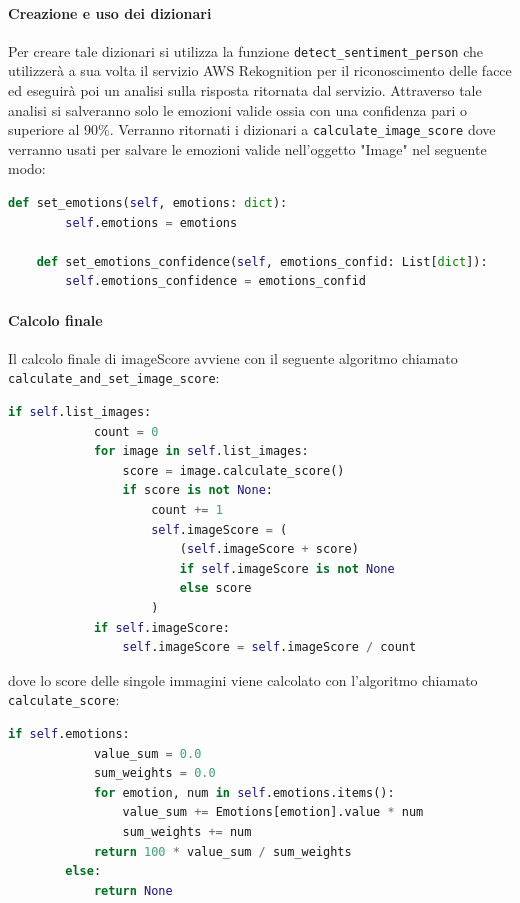 \paragraph{Creazione e uso dei dizionari} \aCapo{}
Per creare tale dizionari si utilizza la funzione \verb+detect_sentiment_person+ che utilizzerà a sua volta il servizio AWS Rekognition per il riconoscimento delle facce ed eseguirà poi un analisi sulla risposta ritornata dal servizio. Attraverso tale analisi si salveranno solo le emozioni valide ossia con una confidenza pari o superiore al 90\%. Verranno ritornati i dizionari a \verb+calculate_image_score+ dove verranno usati per salvare le emozioni valide nell'oggetto "Image" nel seguente modo:
\begin{lstlisting}[language=Python]
    def set_emotions(self, emotions: dict):
        self.emotions = emotions

    def set_emotions_confidence(self, emotions_confid: List[dict]):
        self.emotions_confidence = emotions_confid
\end{lstlisting}
\paragraph{Calcolo finale} \aCapo{}
Il calcolo finale di imageScore avviene con il seguente algoritmo chiamato \verb+calculate_and_set_image_score+: 
\begin{lstlisting}[language=Python]
        if self.list_images:
            count = 0
            for image in self.list_images:
                score = image.calculate_score()
                if score is not None:
                    count += 1
                    self.imageScore = (
                        (self.imageScore + score)
                        if self.imageScore is not None
                        else score
                    )
            if self.imageScore:
                self.imageScore = self.imageScore / count
\end{lstlisting}
dove lo score delle singole immagini viene calcolato con l'algoritmo chiamato \verb+calculate_score+:
\begin{lstlisting}[language=Python]
        if self.emotions:
            value_sum = 0.0
            sum_weights = 0.0
            for emotion, num in self.emotions.items():
                value_sum += Emotions[emotion].value * num
                sum_weights += num
            return 100 * value_sum / sum_weights
        else:
            return None
\end{lstlisting}
